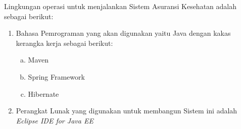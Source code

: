 Lingkungan operasi untuk menjalankan Sistem Asuransi Kesehatan adalah sebagai berikut:
\begin{enumerate}[1.]
	\item Bahasa Pemrograman yang akan digunakan yaitu Java dengan kakas kerangka kerja sebagai berikut:
	\begin{enumerate}[a.]
		\item Maven
		\item Spring Framework
		\item Hibernate
	\end{enumerate}
	\item Perangkat Lunak yang digunakan untuk membangun Sistem ini adalah \textit{Eclipse IDE for Java EE}
\end{enumerate}